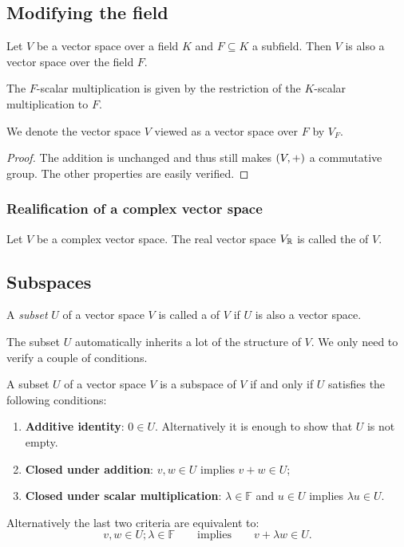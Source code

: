 \subsection{Modifying the field}
\begin{proposition} \label{subfieldVectorSpace}
Let $V$ be a vector space over a field $K$ and $F\subseteq K$ a subfield. Then $V$ is also a vector space over the field $F$. 
\end{proposition}
The $F$-scalar multiplication is given by the restriction of the $K$-scalar multiplication to $F$.

We denote the vector space $V$ viewed as a vector space over $F$ by $V_F$.
\begin{proof}
The addition is unchanged and thus still makes $\left( V,+ \right)$ a commutative group. The other properties are easily verified.
\end{proof}

\subsubsection{Realification of a complex vector space}
\begin{definition}
Let $V$ be a complex vector space. The real vector space $V_{\mathbb{R}}$ is called the  of $V$.
\end{definition}

\subsection{Subspaces}
\begin{definition}
A \textit{subset} $U$ of a vector space $V$ is called a  of $V$ if $U$ is also a vector space.
\end{definition}
The subset $U$ automatically inherits a lot of the structure of $V$. We only need to verify a couple of conditions.
\begin{proposition} \label{subspaceCriterion}
A subset $U$ of a vector space $V$ is a subspace of $V$ \textup{if and only if} $U$ satisfies the following conditions:
\begin{enumerate}
\item \textbf{Additive identity}: $0 \in U$. Alternatively it is enough to show that $U$ is not empty.
\item \textbf{Closed under addition}: $v,w \in U$ implies $v+w\in U$;
\item \textbf{Closed under scalar multiplication}: $\lambda \in \mathbb{F}$ and $u\in U$ implies $\lambda u \in U$.
\end{enumerate}
\end{proposition}
Alternatively the last two criteria are equivalent to:
\[ v,w\in U; \lambda \in \mathbb{F} \qquad \text{implies} \qquad v+\lambda w \in U. \]

